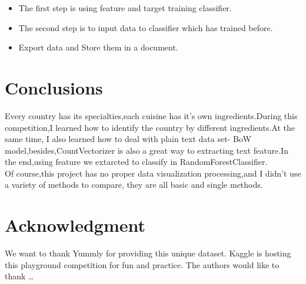 \begin{itemize}
\begin{itemize}
\item
The first step is using feature and target training classifier.
\item
The second step is to input data to classifier which has trained before.
\item 
Export data and Store them in a document.
\end{itemize}


\end{itemize}







\section{Conclusions} \label{sec-conclusions}
Every country has its specialties,each cuisine has it's own ingredients.During this competition,I learned how to
identify the country by different ingredients.At the same time, I also learned how to deal with plain text data set-
BoW model,besides,CountVectorizer is also a great way to extracting text feature.In the end,using feature we extarcted to
classify in RandomForestClassifier.\\
Of course,this project has no proper data visualization processing,and I didn't use a variety of methods to compare,
they are all basic and single methods.
 
\section*{Acknowledgment}

We want to thank Yummly for providing this unique dataset. Kaggle is hosting this playground competition for fun and practice.
The authors would like to thank \ldots\\

